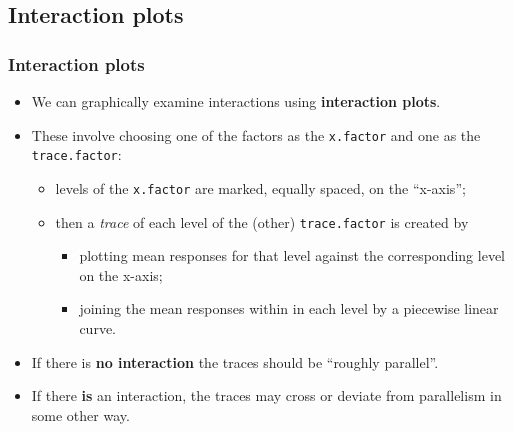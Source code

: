 \documentclass[a4paper]{article}\usepackage[]{graphicx}\usepackage[]{xcolor}
\begin{document}
\subsection{Interaction plots}
\subsubsection{Interaction plots}
\begin{itemize}
	\item We can graphically examine interactions using \textbf{interaction plots}.
	\item These involve choosing one of the factors as the \lstinline|x.factor| and one as the \lstinline|trace.factor|:
	\begin{itemize}
		\item levels of the \lstinline|x.factor| are marked, equally spaced, on the ``x-axis'';
		\item then a \textit{trace} of each level of the (other) \lstinline|trace.factor| is created by
		\begin{itemize}
			\item plotting mean responses for that level against the corresponding level on the x-axis;
			\item joining the mean responses within in each level by a piecewise linear curve.
		\end{itemize}
	\end{itemize}
	\item If there is \textbf{no interaction} the traces should be ``roughly parallel''.
	\item If there \textbf{is} an interaction, the traces may cross or deviate from parallelism in some other way.
\end{itemize}
\end{document}
